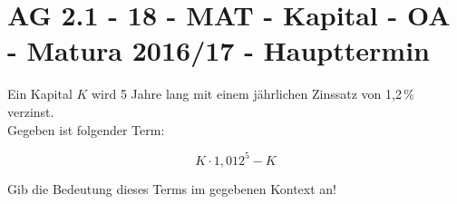 \section{AG 2.1 - 18 - MAT - Kapital - OA - Matura 2016/17 - Haupttermin}

\begin{beispiel}[AG 2.1]{1} %
Ein Kapital $K$ wird 5 Jahre lang mit einem jährlichen Zinssatz von 1,2\,\% verzinst.\\
			
Gegeben ist folgender Term:

\[K\cdot 1,012^5-K\] 

Gib die Bedeutung dieses Terms im gegebenen Kontext an!

\end{beispiel}